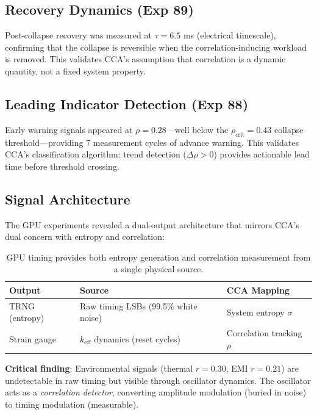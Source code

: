 \documentclass[11pt,a4paper]{article}
\theoremstyle{definition}
\theoremstyle{remark}
\newcommand{\keff}{k_{\text{eff}}}
\begin{document}
\subsection{Recovery Dynamics (Exp 89)}

Post-collapse recovery was measured at $\tau = 6.5$ ms (electrical timescale), confirming that the collapse is reversible when the correlation-inducing workload is removed. This validates CCA's assumption that correlation is a dynamic quantity, not a fixed system property.

\subsection{Leading Indicator Detection (Exp 88)}

Early warning signals appeared at $\rho = 0.28$---well below the $\rho_{\text{crit}} = 0.43$ collapse threshold---providing 7 measurement cycles of advance warning. This validates CCA's classification algorithm: trend detection ($\Delta\rho > 0$) provides actionable lead time before threshold crossing.

\subsection{Signal Architecture}

The GPU experiments revealed a dual-output architecture that mirrors CCA's dual concern with entropy and correlation:

\begin{table}[H]
\centering
\begin{tabular}{lll}
\toprule
\textbf{Output} & \textbf{Source} & \textbf{CCA Mapping} \\
\midrule
TRNG (entropy) & Raw timing LSBs (99.5\% white noise) & System entropy $\sigma$ \\
Strain gauge & $\keff$ dynamics (reset cycles) & Correlation tracking $\rho$ \\
\bottomrule
\end{tabular}
\caption{GPU timing provides both entropy generation and correlation measurement from a single physical source.}
\end{table}

\textbf{Critical finding}: Environmental signals (thermal $r=0.30$, EMI $r=0.21$) are undetectable in raw timing but visible through oscillator dynamics. The oscillator acts as a \textit{correlation detector}, converting amplitude modulation (buried in noise) to timing modulation (measurable).
\end{document}
